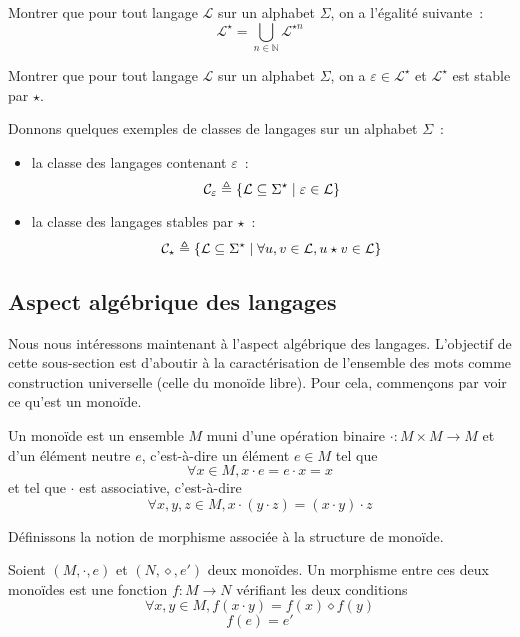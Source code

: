 \begin{exercise}
  Montrer que pour tout langage $\mathcal L$ sur un alphabet $\Sigma$, on a
  l'égalité suivante~:
  \[\mathcal L^\star = \bigcup_{n \in \mathbb N} \mathcal L^{\star n}\]
\end{exercise}

\begin{exercise}
  Montrer que pour tout langage $\mathcal L$ sur un alphabet $\Sigma$, on a
  $\varepsilon \in \mathcal L^\star$ et $\mathcal L^\star$ est stable par
  $\star$.
\end{exercise}

\begin{example}
  Donnons quelques exemples de classes de langages sur un alphabet $\Sigma$~:
  \begin{itemize}
  \item la classe des langages contenant $\varepsilon$~:
    \[\mathcal C_\varepsilon \triangleq \{\mathcal L \subseteq \Sigma^\star\mid
    \varepsilon \in \mathcal L\}\]
  \item la classe des langages stables par $\star$~:
    \[\mathcal C_\star \triangleq \{\mathcal L \subseteq \Sigma^\star\mid
    \forall u,v\in\mathcal L, u\star v \in \mathcal L\}\]
  \end{itemize}
\end{example}

\subsection{Aspect algébrique des langages}

Nous nous intéressons maintenant à l'aspect algébrique des langages. L'objectif
de cette sous-section est d'aboutir à la caractérisation de l'ensemble des mots
comme construction universelle (celle du monoïde libre). Pour cela, commençons
par voir ce qu'est un monoïde.

\begin{definition}[Monoïde]
  Un monoïde est un ensemble $M$ muni d'une opération binaire
  $\cdot : M \times M \to M$ et d'un élément neutre $e$,
  c'est-à-dire un élément $e\in M$ tel que
  \[\forall x\in M, x\cdot e = e \cdot x = x\]
  et tel que $\cdot$ est associative, c'est-à-dire
  \[\forall x,y,z\in M, x\cdot (y\cdot z) = (x\cdot y) \cdot z\]
\end{definition}

Définissons la notion de morphisme associée à la structure de monoïde.

\begin{definition}
  Soient $(M,\cdot,e)$ et $(N,\diamond,e')$ deux monoïdes. Un morphisme entre
  ces deux monoïdes est une fonction $f : M \to N$ vérifiant les deux conditions
  \begin{equation}
    \forall x,y\in M, f(x\cdot y) = f(x)\diamond f(y)
  \end{equation}
  \begin{equation}
    f(e) = e'
  \end{equation}
\end{definition}

